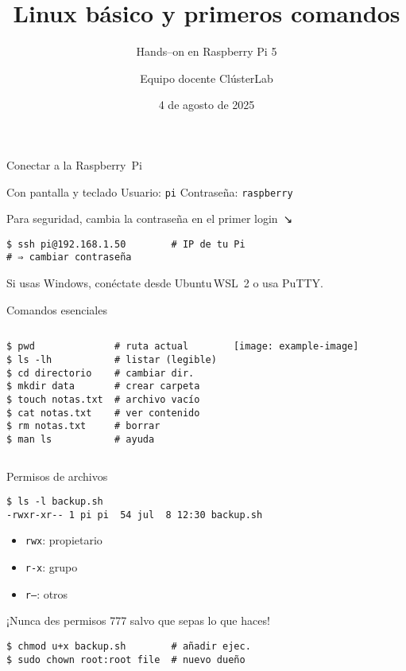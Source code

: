 \documentclass[aspectratio=169,professionalfonts]{beamer}
\title[ClústerLab • Día 1]{Linux básico y primeros comandos}
\subtitle{Hands--on en Raspberry Pi 5}
\author{Equipo docente ClústerLab}
\date{4 de agosto de 2025}
\begin{document}
\begin{frame}[plain]
  \titlepage
\end{frame}

\begin{frame}[fragile]{Conectar a la Raspberry Pi}
  \begin{block}{Con pantalla y teclado}
    Usuario: \texttt{pi} \hfill Contraseña: \texttt{raspberry}
  \end{block}
  \begin{infobox}
    Para seguridad, cambia la contraseña en el primer login ↘︎
  \end{infobox}
  \begin{verbatim}
$ ssh pi@192.168.1.50        # IP de tu Pi
# ⇒ cambiar contraseña
  \end{verbatim}
  \small Si usas Windows, conéctate desde Ubuntu WSL 2 o usa PuTTY.
\end{frame}

\begin{frame}[fragile]{Comandos esenciales}
\begin{columns}[T,onlytextwidth]
\begin{verbatim}
$ pwd              # ruta actual
$ ls -lh           # listar (legible)
$ cd directorio    # cambiar dir.
$ mkdir data       # crear carpeta
$ touch notas.txt  # archivo vacío
$ cat notas.txt    # ver contenido
$ rm notas.txt     # borrar
$ man ls           # ayuda
\end{verbatim}

\centering
\texttt{[image: example-image]}
\end{columns}
\end{frame}

\begin{frame}[fragile]{Permisos de archivos}
\begin{verbatim}
$ ls -l backup.sh
-rwxr-xr-- 1 pi pi  54 jul  8 12:30 backup.sh
\end{verbatim}

\begin{itemize}
  \item \texttt{rwx}: propietario
  \item \texttt{r-x}: grupo
  \item \texttt{r--}: otros
\end{itemize}

\begin{warnbox}
  ¡Nunca des permisos 777 salvo que sepas lo que haces!
\end{warnbox}

\begin{verbatim}
$ chmod u+x backup.sh        # añadir ejec.
$ sudo chown root:root file  # nuevo dueño
\end{verbatim}
\end{frame}
\end{document}
